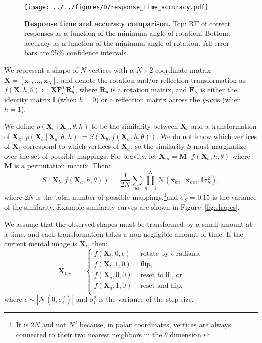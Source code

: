 \documentclass[10pt,letterpaper]{article}
\newcommand{\Xa}[0]{\mathbf{X}_a}
\newcommand{\Xb}[0]{\mathbf{X}_b}
\newcommand{\Xt}[0]{\mathbf{X}_t}
\newcommand{\R}[0]{\mathbf{R}_\theta}
\newcommand{\F}[0]{\mathbf{F}}
\newcommand{\M}[0]{\mathbf{M}}
\newcommand{\I}[0]{\mathbb{I}}
\newcommand{\hi}[0]{h=0}
\newcommand{\hf}[0]{h=1}
\begin{document}
\begin{figure*}[t]
  \begin{center}
    \texttt{[image: ../../figures/D/response\_time\_accuracy.pdf]}
    \caption{\textbf{Response time and accuracy comparison.} Top: RT
      of correct responses as a function of the minimum angle of
      rotation. Bottom: accuracy as a function of the minimum angle of
      rotation. All error bars are 95\% confidence intervals.}
    \label{fig:response-time-accuracy}
  \end{center}
\end{figure*}

We represent a shape of $N$ vertices with a $N\times 2$ coordinate
matrix $\mathbf{X}=[\mathbf{x}_1, \ldots{}, \mathbf{x}_N]$, and denote
the rotation and/or reflection transformation as $f(\mathbf{X}, h,
\theta):=\mathbf{X}\F_h^T\R^T$, where $\R$ is a rotation matrix, and
$\F_h$ is either the identity matrix $\I$ (when $\hi$) or a reflection
matrix across the $y$-axis (when $\hf$).

We define $p(\Xb\ \vert\ \Xa, \theta, h)$ to be the similarity between
$\Xb$ and a transformation of $\Xa$: $p(\Xb\ \vert\ \Xa, \theta, h):=
S(\Xb, f(\Xa, h, \theta))$.  We do not know which vertices of $\Xb$
correspond to which vertices of $\Xa$, so the similarity $S$ must
marginalize over the set of possible mappings. For brevity, let
$\mathbf{X}_m=\M\cdot{}f(\Xa, h, \theta)$ where $\M$ is a permutation
matrix. Then:
\begin{equation}
  S(\Xb, f(\Xa, h, \theta)):=\frac{1}{2N} \sum_{\M} \prod_{n=1}^N \mathcal{N}(\mathbf{x}_{bn}\ \vert \ \mathbf{x}_{mn}, \I\sigma_S^2),
  \label{eq:similarity}
\end{equation}
where $2N$ is the total number of possible mappings,\footnote{It is
  $2N$ and not $N^2$ because, in polar coordinates, vertices are
  always connected to their two nearest neighbors in the $\theta$
  dimension.}and $\sigma_S^2=0.15$ is the variance of the
similarity. Example similarity curves are shown in
Figure~\ref{fig:shapes}.

We assume that the observed shapes must be transformed by a small
amount at a time, and each transformation takes a non-negligible
amount of time. If the current mental image is $\Xt$, then:
\begin{equation}
  \mathbf{X}_{t+1} = \left\{ \begin{array}{ll}
      f(\Xt, 0, \epsilon) &\mbox{ rotate by $\epsilon$ radians,} \\
      f(\Xt, 1, 0) &\mbox{ flip,} \\
      f(\Xa, 0, 0) &\mbox{ reset to $0^\circ$, or} \\
      f(\Xa, 1, 0) &\mbox{ reset and flip,} \\
    \end{array} \right.
  \label{eq:actions}
\end{equation}
where $\epsilon\sim \left|\mathcal{N}(0, \sigma_\epsilon^2)\right|$
and $\sigma_\epsilon^2$ is the variance of the step size.
\end{document}

